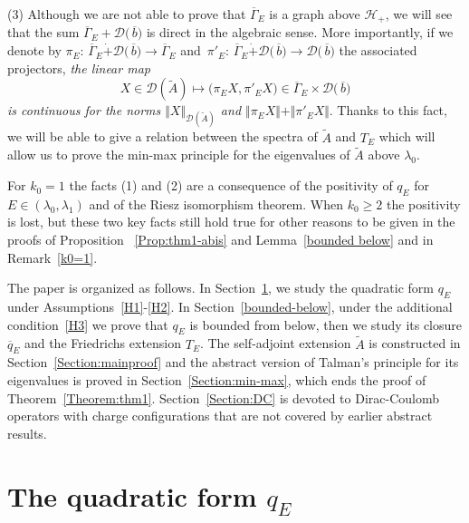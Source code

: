 \documentclass[12pt,reqno]{amsart}
\renewcommand{\(}{\left(}
\renewcommand{\)}{\right)}
\begin{document}
\noindent
(3) Although we are not able to prove that $\overline{\Gamma}_E$ is a graph above $\mathcal H_+$, we will see that the sum $\overline{\Gamma}_E+ \mathcal D\big(\,\overline{b}\big)$ is direct in the algebraic sense. More importantly, if we denote by $\pi_E:\,\overline{\Gamma}_E\dot{+} \mathcal D\big(\,\overline{b}\big)\to\overline{\Gamma}_E$ and $\,\pi'_E:\,\overline{\Gamma}_E\dot{+} \mathcal D\big(\,\overline{b}\big)\to\mathcal D\big(\,\overline{b}\big)$ the associated projectors, {\it the linear map
\[X\in\mathcal D(\widetilde A)\mapsto \big(\pi_E X,\pi'_E X\big)\in \overline{\Gamma}_E\times \mathcal D\big(\,\overline{b}\big)\]
is continuous for the norms $\Vert X\Vert_{\mathcal D(\widetilde A)}$ and $\Vert \pi_E X\Vert+\Vert \pi'_E X\Vert$}. Thanks to this fact, we will be able to give a relation between the spectra of $\widetilde A$ and $T_E$ which will allow us to prove the min-max principle for the eigenvalues of $\widetilde A$ above $\lambda_0$.

\noindent
For $k_0=1$ the facts (1) and (2) are a consequence of the positivity of $q_E$ for $E\in (\lambda_0,\lambda_{1})$ and of the Riesz isomorphism theorem. When $k_0\geq 2$ the positivity is lost, but these two key facts still hold true for other reasons to be given in the proofs of Proposition ~\ref{Prop:thm1-abis} and Lemma~\ref{bounded below} and in Remark~\ref{k0=1}.
\bigskip

\noindent The paper is organized as follows. In Section~\ref{Section:Gen}, we study the quadratic form $q_E$ under Assumptions~\eqref{H1}-\eqref{H2}. In Section~\ref{bounded-below}, under the additional condition~\eqref{H3} we prove that $q_E$ is bounded from below, then we study its closure $\overline{q}_E$ and the Friedrichs extension $T_E$. The self-adjoint extension $\widetilde A$ is constructed in Section~\ref{Section:mainproof} and the abstract version of Talman's principle for its eigenvalues is proved in Section~\ref{Section:min-max}, which ends the proof of Theorem~\ref{Theorem:thm1}. Section~\ref{Section:DC} is devoted to Dirac-Coulomb operators with charge configurations that are not covered by earlier abstract results.


\section{The quadratic form \texorpdfstring{$q_E$}{qE}}\label{Section:Gen}
\end{document}
